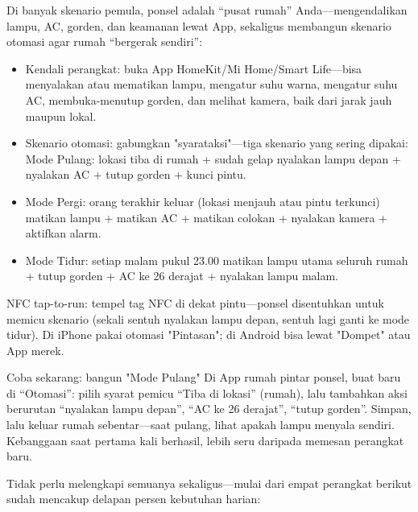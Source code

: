 Di banyak skenario pemula, ponsel adalah “pusat rumah” Anda—mengendalikan lampu, AC, gorden, dan keamanan lewat App, sekaligus membangun skenario otomasi agar rumah “bergerak sendiri”:

\begin{itemize}
  \item Kendali perangkat: buka App HomeKit/Mi Home/Smart Life—bisa menyalakan atau mematikan lampu, mengatur suhu warna, mengatur suhu AC, membuka-menutup gorden, dan melihat kamera, baik dari jarak jauh maupun lokal.
  \item Skenario otomasi: gabungkan "syarataksi"—tiga skenario yang sering dipakai: Mode Pulang: lokasi tiba di rumah + sudah gelap nyalakan lampu depan + nyalakan AC + tutup gorden + kunci pintu.
  \item Mode Pergi: orang terakhir keluar (lokasi menjauh atau pintu terkunci) matikan lampu + matikan AC + matikan colokan + nyalakan kamera + aktifkan alarm.
  \item Mode Tidur: setiap malam pukul 23.00 matikan lampu utama seluruh rumah + tutup gorden + AC ke 26 derajat + nyalakan lampu malam.
\end{itemize}

NFC tap-to-run: tempel tag NFC di dekat pintu—ponsel disentuhkan untuk memicu skenario (sekali sentuh nyalakan lampu depan, sentuh lagi ganti ke mode tidur). Di iPhone pakai otomasi "Pintasan"; di Android bisa lewat "Dompet" atau App merek.

\begin{tcbpractice}{Coba sekarang: bangun "Mode Pulang"}
Di App rumah pintar ponsel, buat baru di “Otomasi”: pilih syarat pemicu “Tiba di lokasi” (rumah), lalu tambahkan aksi berurutan “nyalakan lampu depan”, “AC ke 26 derajat”, “tutup gorden”. Simpan, lalu keluar rumah sebentar—saat pulang, lihat apakah lampu menyala sendiri. Kebanggaan saat pertama kali berhasil, lebih seru daripada memesan perangkat baru.

\end{tcbpractice}


Tidak perlu melengkapi semuanya sekaligus—mulai dari empat perangkat berikut sudah mencakup delapan persen kebutuhan harian:

